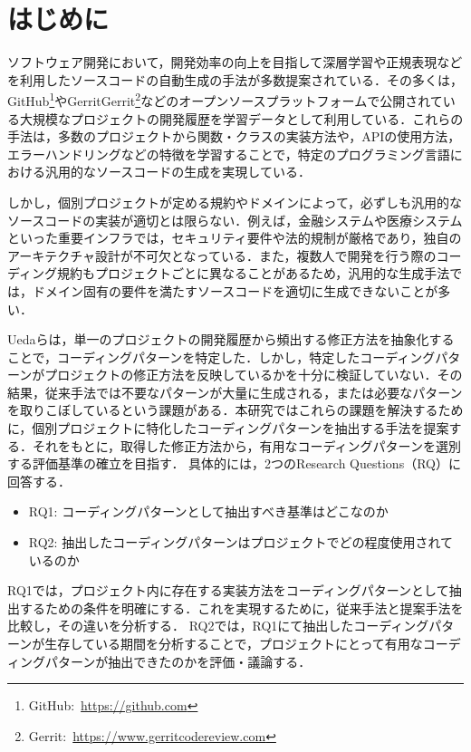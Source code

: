 \documentclass[twocolumn]{jarticle} %
\newcommand{\RQone}{コーディングパターンとして抽出すべき基準はどこなのか}
\newcommand{\RQtwo}{抽出したコーディングパターンはプロジェクトでどの程度使用されているのか}
\begin{document}
\maketitle
\thispagestyle{empty} %



\section{はじめに}
ソフトウェア開発において，開発効率の向上を目指して深層学習や正規表現などを利用したソースコードの自動生成の手法が多数提案されている\cite{smith}．その多くは，GitHub\footnote{GitHub:~\url{https://github.com}}やGerritGerrit\footnote{Gerrit:~\url{https://www.gerritcodereview.com}}などのオープンソースプラットフォームで公開されている大規模なプロジェクトの開発履歴を学習データとして利用している．これらの手法は，多数のプロジェクトから関数・クラスの実装方法や，APIの使用方法，エラーハンドリングなどの特徴を学習することで，特定のプログラミング言語における汎用的なソースコードの生成を実現している．

しかし，個別プロジェクトが定める規約やドメインによって，必ずしも汎用的なソースコードの実装が適切とは限らない．例えば，金融システムや医療システムといった重要インフラでは，セキュリティ要件や法的規制が厳格であり，独自のアーキテクチャ設計が不可欠となっている．また，複数人で開発を行う際のコーディング規約もプロジェクトごとに異なることがあるため，汎用的な生成手法では，ドメイン固有の要件を満たすソースコードを適切に生成できないことが多い．

Uedaらは，単一のプロジェクトの開発履歴から頻出する修正方法を抽象化することで，コーディングパターンを特定した\cite{devreplay}．しかし，特定したコーディングパターンがプロジェクトの修正方法を反映しているかを十分に検証していない．その結果，従来手法では不要なパターンが大量に生成される，または必要なパターンを取りこぼしているという課題がある．本研究ではこれらの課題を解決するために，個別プロジェクトに特化したコーディングパターンを抽出する手法を提案する．それをもとに，取得した修正方法から，有用なコーディングパターンを選別する評価基準の確立を目指す．
具体的には，2つのResearch Questions（RQ）に回答する．
\begin{itemize}
    \item RQ1: \RQone
    \item RQ2: \RQtwo
\end{itemize}
RQ1では，プロジェクト内に存在する実装方法をコーディングパターンとして抽出するための条件を明確にする．これを実現するために，従来手法と提案手法を比較し，その違いを分析する．
RQ2では，RQ1にて抽出したコーディングパターンが生存している期間を分析することで，プロジェクトにとって有用なコーディングパターンが抽出できたのかを評価・議論する．
\end{document}
